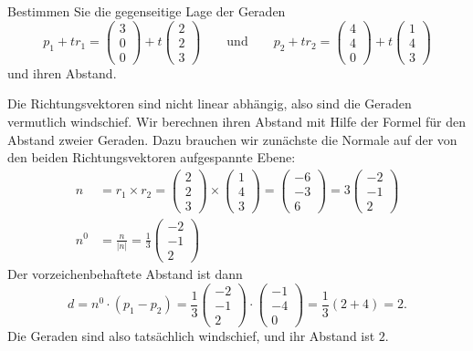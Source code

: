 Bestimmen Sie die gegenseitige Lage der Geraden
\[
p_1+tr_1
=
\begin{pmatrix} 3\\ 0\\ 0 \end{pmatrix}
+t
\begin{pmatrix} 2\\ 2\\ 3 \end{pmatrix}
\qquad
\text{und}
\qquad
p_2+tr_2
=
\begin{pmatrix} 4\\ 4\\ 0 \end{pmatrix}
+t
\begin{pmatrix} 1\\ 4\\ 3 \end{pmatrix}
\]
und ihren Abstand.

\begin{loesung}
Die Richtungsvektoren sind nicht linear abhängig, also sind
die Geraden vermutlich windschief. Wir berechnen ihren Abstand mit
Hilfe der Formel für den Abstand zweier Geraden. Dazu brauchen
wir zunächste die Normale auf der von den beiden Richtungsvektoren
aufgespannte Ebene:
\begin{align*}
n&=r_1\times r_2 =\begin{pmatrix} 2\\ 2\\ 3 \end{pmatrix}
\times
\begin{pmatrix} 1\\ 4\\ 3 \end{pmatrix}
=
\begin{pmatrix} -6\\-3\\6 \end{pmatrix}
=3
\begin{pmatrix} -2\\-1\\2 \end{pmatrix}
\\
n^0&=\frac{n}{|n|}=
\frac13
\begin{pmatrix} -2\\-1\\2 \end{pmatrix}
\end{align*}
Der vorzeichenbehaftete Abstand ist dann
\[
d=n^0\cdot(p_1-p_2)=
\frac13
\begin{pmatrix} -2\\-1\\2 \end{pmatrix}
\cdot
\begin{pmatrix} -1\\-4\\0\end{pmatrix}
=\frac13(2+4)=2.
\]
Die Geraden sind also tatsächlich windschief, und
ihr Abstand ist $2$.
\end{loesung}

